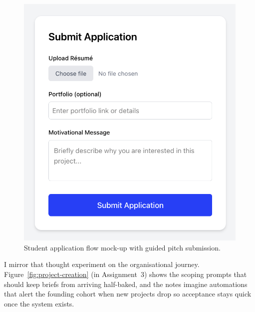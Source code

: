 \begin{figure}[H]
  \centering
  \includegraphics[width=0.85\linewidth]{figures/Student-Submission.png}
  \caption{Student application flow mock-up with guided pitch submission.}
  \label{fig:application-flow}
\end{figure}

I mirror that thought experiment on the organisational journey. Figure~\ref{fig:project-creation} (in Assignment~3) shows the scoping prompts that should keep briefs from arriving half-baked, and the notes imagine automations that alert the founding cohort when new projects drop so acceptance stays quick once the system exists.
